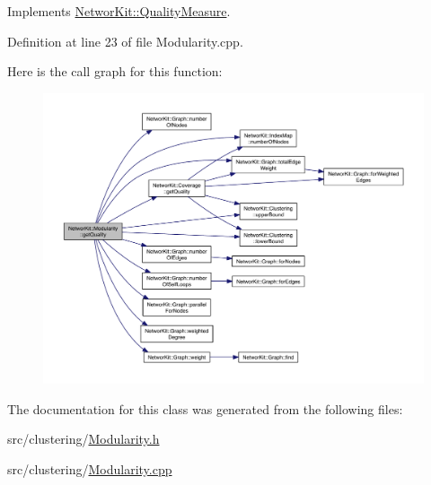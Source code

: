 Implements \hyperlink{class_networ_kit_1_1_quality_measure_a1ca0aecc5d7f564fc627af2baf86239c}{Networ\-Kit\-::\-Quality\-Measure}.



Definition at line 23 of file Modularity.\-cpp.



Here is the call graph for this function\-:\nopagebreak
\begin{figure}[H]
\begin{center}
\leavevmode
\includegraphics[width=350pt]{class_networ_kit_1_1_modularity_a8788753db47a3698219933b3a37357b9_cgraph}
\end{center}
\end{figure}




The documentation for this class was generated from the following files\-:\begin{DoxyCompactItemize}
\item 
src/clustering/\hyperlink{_modularity_8h}{Modularity.\-h}\item 
src/clustering/\hyperlink{_modularity_8cpp}{Modularity.\-cpp}\end{DoxyCompactItemize}
